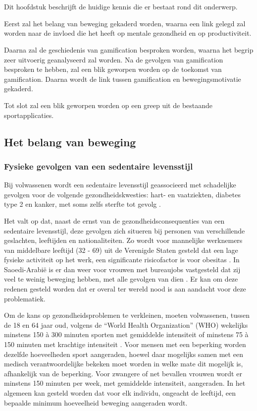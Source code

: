 \chapter{}%
\label{ch:stand-van-zaken}

Dit hoofdstuk beschrijft de huidige kennis die er bestaat rond dit onderwerp.

Eerst zal het belang van beweging gekaderd worden, waarna een link gelegd zal worden naar de invloed die het heeft op mentale gezondheid en op productiviteit.

Daarna zal de geschiedenis van gamification besproken worden, waarna het begrip zeer uitvoerig geanalyseerd zal worden. Na de gevolgen van gamification besproken te hebben, zal een blik geworpen worden op de toekomst van gamification. Daarna wordt de link tussen gamification en bewegingsmotivatie gekaderd.

Tot slot zal een blik geworpen worden op een greep uit de bestaande sportapplicaties.

\section{Het belang van beweging}

\subsection{Fysieke gevolgen van een sedentaire levensstijl}
\label{ssec:fysieke-gevolgen}
Bij volwassenen wordt een sedentaire levensstijl geassocieerd met schadelijke gevolgen voor de volgende gezondheidskwesties: hart- en vaatziekten, diabetes type 2 en kanker, met soms zelfs sterfte tot gevolg \autocite{Bull2020}.

Het valt op dat, naast de ernst van de gezondheidsconsequenties van een sedentaire levensstijl, deze gevolgen zich situeren bij personen van verschillende geslachten, leeftijden en nationaliteiten. Zo wordt voor mannelijke werknemers van middelbare leeftijd (32 - 69) uit de Verenigde Staten gesteld dat een lage fysieke activiteit op het werk, een significante risicofactor is voor obesitas \autocite{Choi2010}. In Saoedi-Arabië is er dan weer voor vrouwen met bureaujobs vastgesteld dat zij veel te weinig beweging hebben, met alle gevolgen van dien \autocite{Albawardi2017}. Er kan om deze redenen gesteld worden dat er overal ter wereld nood is aan aandacht voor deze problematiek.

Om de kans op gezondheidsproblemen te verkleinen, moeten volwassenen, tussen de 18 en 64 jaar oud, volgens de ``World Health Organization'' (WHO) wekelijks minstens 150 à 300 minuten sporten met gemiddelde intensiteit of minstens 75 à 150 minuten met krachtige intensiteit \autocite{Bull2020}. Voor mensen met een beperking worden dezelfde hoeveelheden sport aangeraden, hoewel daar mogelijks samen met een medisch verantwoordelijke bekeken moet worden in welke mate dit mogelijk is, afhankelijk van de beperking. Voor zwangere of net bevallen vrouwen wordt er minstens 150 minuten per week, met gemiddelde intensiteit, aangeraden. In het algemeen kan gesteld worden dat voor elk individu, ongeacht de leeftijd, een bepaalde minimum hoeveelheid beweging aangeraden wordt.

